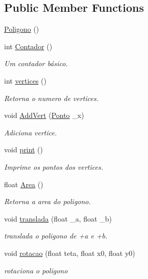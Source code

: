 \subsection*{Public Member Functions}
\begin{DoxyCompactItemize}
\item 
\mbox{\hyperlink{class_poligono_a9311a9a1496878c09c8508b3636e2870}{Poligono}} ()
\item 
int \mbox{\hyperlink{class_poligono_a345539e8cc714d4e429c92fbfbb825d6}{Contador}} ()
\begin{DoxyCompactList}\small\item\em Um contador básico. \end{DoxyCompactList}\item 
int \mbox{\hyperlink{class_poligono_a0e4a1dda914bb96506976c0ff2f17f23}{vertices}} ()
\begin{DoxyCompactList}\small\item\em Retorna o numero de vertices. \end{DoxyCompactList}\item 
void \mbox{\hyperlink{class_poligono_ae1be40b54bc95099e1296e156b246881}{Add\+Vert}} (\mbox{\hyperlink{class_ponto}{Ponto}} \+\_\+x)
\begin{DoxyCompactList}\small\item\em Adiciona vertice. \end{DoxyCompactList}\item 
void \mbox{\hyperlink{class_poligono_ac22d76a087d08ea82627be416404ae15}{print}} ()
\begin{DoxyCompactList}\small\item\em Imprime os pontos dos vertices. \end{DoxyCompactList}\item 
float \mbox{\hyperlink{class_poligono_a15cc3e743e4347d966ba12fa2cdb69b7}{Area}} ()
\begin{DoxyCompactList}\small\item\em Retorna a area do poligono. \end{DoxyCompactList}\item 
void \mbox{\hyperlink{class_poligono_aafacd43b0918e0765fbb42d9aad5bb35}{translada}} (float \+\_\+a, float \+\_\+b)
\begin{DoxyCompactList}\small\item\em translada o poligono de +a e +b. \end{DoxyCompactList}\item 
void \mbox{\hyperlink{class_poligono_a487911a74fc40ea3cdea61380889e180}{rotacao}} (float teta, float x0, float y0)
\begin{DoxyCompactList}\small\item\em rotaciona o poligono \end{DoxyCompactList}\end{DoxyCompactItemize}


